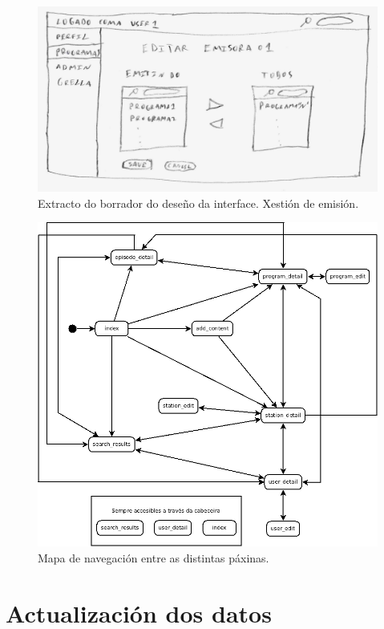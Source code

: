 \begin{figure}[H]
	\centering
	\includegraphics[scale=0.2,keepaspectratio=true]{./images/manage1_p.png}
	\caption{Extracto do borrador do deseño da interface. Xestión de emisión.}
	\label{fig:manage1_p}
\end{figure}


\begin{figure}[H]
	\centering
	\includegraphics[scale=0.5,keepaspectratio=true]{./images/access_tree_auth.png}
	\caption{Mapa de navegación entre as distintas páxinas.}
	\label{fig:access_tree}
\end{figure}


\section{Actualización dos datos}
\label{daemon_desenho}

